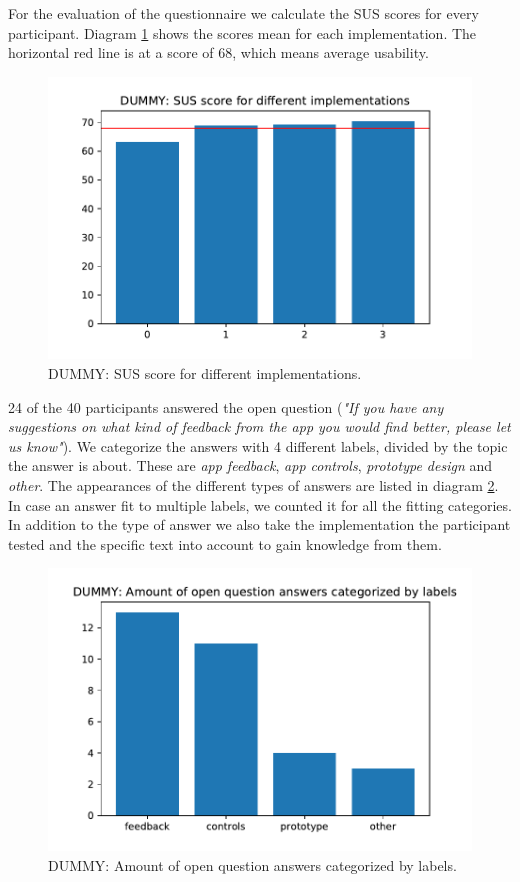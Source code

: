 \documentclass[11pt, a4paper]{article}
\begin{document}
			For the evaluation of the questionnaire we calculate the \ac{SUS} scores for every participant. Diagram \ref{fig:sus} shows the scores mean for each implementation. The horizontal red line is at a score of 68, which means average usability.

			\begin{figure}[H]
						\centering
						\includegraphics[width=.49\textwidth]{img/plot/plot_sus.pdf}
						\caption{DUMMY: SUS score for different implementations.}
						\label{fig:sus}
					\end{figure}

			24 of the 40 participants answered the open question (\emph{"If you have any suggestions on what kind of feedback from the app you would find better, please let us know"}). We categorize the answers with 4 different labels, divided by the topic the answer is about. These are \emph{app feedback}, \emph{app controls}, \emph{prototype design} and \emph{other}. The appearances of the different types of answers are listed in diagram \ref{fig:tags}. In case an answer fit to multiple labels, we counted it for all the fitting categories. In addition to the type of answer we also take the implementation the participant tested and the specific text into account to gain knowledge from them. 

			\begin{figure}[H]
						\centering
						\includegraphics[width=.49\textwidth]{img/plot/plot_tags.pdf}
						\caption{DUMMY: Amount of open question answers categorized by labels.}
						\label{fig:tags}
					\end{figure}
\end{document}
